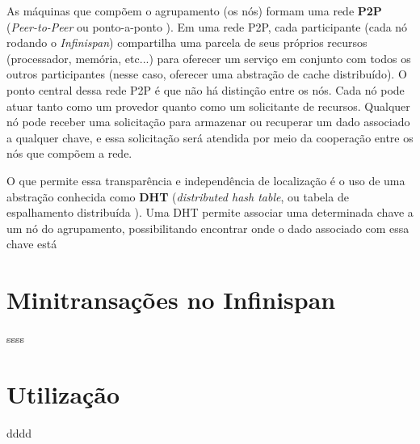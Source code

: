 \documentclass[11pt,twoside,a4paper]{book}
\renewcommand{\chaptermark}[1]{\markboth{\MakeUppercase{#1}}{}}
\begin{document}
As máquinas que compõem o agrupamento (os nós) formam uma rede \textbf{P2P} (\emph{Peer-to-Peer} ou ponto-a-ponto \cite{p2p}). Em uma rede P2P,
cada participante (cada nó rodando o \emph{Infinispan}) compartilha uma parcela de seus próprios recursos (processador, memória, 
etc...) para oferecer um serviço em conjunto com todos os outros participantes (nesse caso, oferecer uma abstração de cache distribuído).
O ponto central dessa rede P2P é que não há distinção entre os nós. Cada nó pode atuar tanto como um provedor quanto 
como um solicitante de recursos. Qualquer nó pode receber uma solicitação para armazenar ou recuperar um dado associado a qualquer
chave, e essa solicitação será atendida por meio da cooperação entre os nós que compõem a rede.

O que permite essa transparência e independência de localização é o uso de uma abstração conhecida como \textbf{DHT} (\emph{distributed hash table}, 
ou tabela de espalhamento distribuída \cite{dht}). Uma DHT permite associar uma determinada chave a um nó do agrupamento, possibilitando
encontrar onde o dado associado com essa chave está

\section{Minitransações no Infinispan}
\label{sec:mt_infinispan}
ssss

\section{Utilização}
\label{sec:utilizacao}
dddd

\renewcommand{\chaptermark}[1]{\markboth{\MakeUppercase{\appendixname\ \thechapter}} {\MakeUppercase{#1}} }
\fancyhead[RE,LO]{}
\appendix

\backmatter \singlespacing   %
\end{document}
